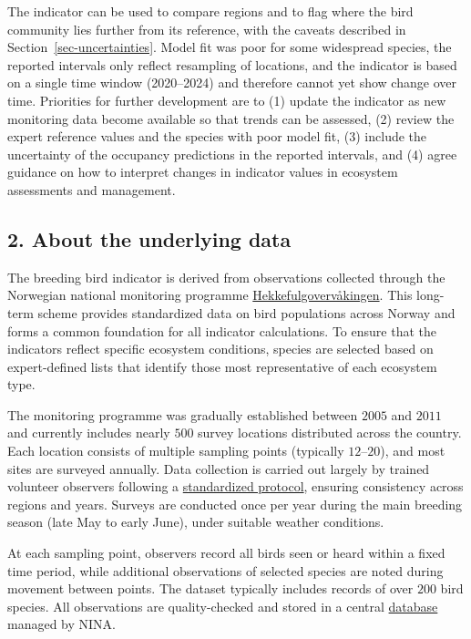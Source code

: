 \documentclass[
  letterpaper,
  DIV=11,
  numbers=noendperiod]{scrartcl}
\begin{document}
The indicator can be used to compare regions and to flag where the bird
community lies further from its reference, with the caveats described in
Section~\ref{sec-uncertainties}. Model fit was poor for some widespread
species, the reported intervals only reflect resampling of locations,
and the indicator is based on a single time window (2020--2024) and
therefore cannot yet show change over time. Priorities for further
development are to (1) update the indicator as new monitoring data
become available so that trends can be assessed, (2) review the expert
reference values and the species with poor model fit, (3) include the
uncertainty of the occupancy predictions in the reported intervals, and
(4) agree guidance on how to interpret changes in indicator values in
ecosystem assessments and management.

\subsection{2. About the underlying data}\label{sec-underlyingData}

The breeding bird indicator is derived from observations collected
through the Norwegian national monitoring programme
\href{https://hekkefuglovervakingen.nina.no/Fugl/Default.aspx?ReturnUrl=\%2fFugl\%2f}{Hekkefulgovervåkingen}.
This long-term scheme provides standardized data on bird populations
across Norway and forms a common foundation for all indicator
calculations. To ensure that the indicators reflect specific ecosystem
conditions, species are selected based on expert-defined lists that
identify those most representative of each ecosystem type.

The monitoring programme was gradually established between \(2005\) and
\(2011\) and currently includes nearly \(500\) survey locations
distributed across the country. Each location consists of multiple
sampling points (typically \(12–20\)), and most sites are surveyed
annually. Data collection is carried out largely by trained volunteer
observers following a
\href{https://hekkefuglovervakingen.nina.no/Fugl/public/papirskjema/MethodologyEng.pdf}{standardized
protocol}, ensuring consistency across regions and years. Surveys are
conducted once per year during the main breeding season (late May to
early June), under suitable weather conditions.

At each sampling point, observers record all birds seen or heard within
a fixed time period, while additional observations of selected species
are noted during movement between points. The dataset typically includes
records of over \(200\) bird species. All observations are
quality-checked and stored in a central
\href{https://hekkefuglovervakingen.nina.no/Fugl/Default.aspx}{database}
managed by NINA.
\end{document}
